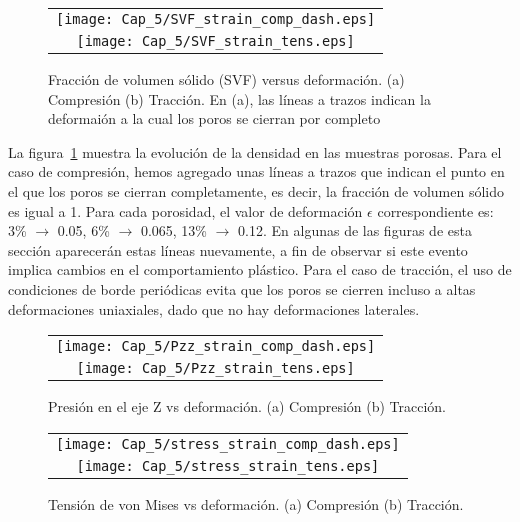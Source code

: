 \begin{figure}[h!]
  \centering
  \begin{tabular} {c}
    \texttt{[image: Cap\_5/SVF\_strain\_comp\_dash.eps]}\\
    \texttt{[image: Cap\_5/SVF\_strain\_tens.eps]}\\
  \end{tabular}
  \caption[Fracción de volumen sólido (SVF) versus deformación.]{Fracción de volumen sólido (SVF) versus deformación. (a) Compresión
  (b) Tracción. En (a), las líneas a trazos indican la deformaión a la cual los poros se cierran por completo}
  \label{C5:fg:svf}
\end{figure}

La figura~\ref{C5:fg:svf} muestra la evolución de la densidad en las muestras porosas. Para el caso de compresión, hemos agregado unas líneas a trazos
que indican el punto en el que los poros se cierran completamente, es decir, la fracción de volumen sólido es igual a 1.
Para cada porosidad, el valor de deformación $\epsilon$ correspondiente es: 3\% $\rightarrow$ 0.05, 6\% $\rightarrow$ 0.065, 13\% $\rightarrow$ 0.12.
En algunas de las figuras de esta sección aparecerán estas líneas nuevamente, a fin de observar si este evento implica cambios en el comportamiento
plástico. Para el caso de tracción, el uso de condiciones de borde periódicas evita que los poros se cierren incluso a altas
deformaciones uniaxiales, dado que no hay deformaciones laterales.

\begin{figure}[h!]
  \centering
  \begin{tabular} {c}
    \texttt{[image: Cap\_5/Pzz\_strain\_comp\_dash.eps]}\\
    \texttt{[image: Cap\_5/Pzz\_strain\_tens.eps]}\\
  \end{tabular}
  \caption[Presión en el eje Z vs deformación.]{Presión en el eje Z vs deformación. (a) Compresión (b) Tracción.}
  \label{C5:fg:pzz2}
\end{figure}

\begin{figure}[h!]
  \centering
  \begin{tabular} {c}
    \texttt{[image: Cap\_5/stress\_strain\_comp\_dash.eps]}\\
    \texttt{[image: Cap\_5/stress\_strain\_tens.eps]}\\
  \end{tabular}
  \caption[Tensión de von Mises vs deformación.]{Tensión de von Mises vs deformación. (a) Compresión (b) Tracción.}
  \label{C5:fg:stress}
\end{figure}


